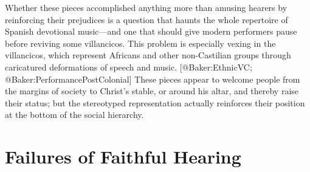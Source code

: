 Whether these pieces accomplished anything more than amusing hearers by reinforcing their prejudices is a question that haunts the whole repertoire of Spanish devotional music---and one that should give modern performers pause before reviving some villancicos.
\Autocite[7]{Cashner:WLSCM32}
This problem is especially vexing in the  villancicos, which represent Africans and other non-Castilian groups through caricatured deformations of speech and music.
[@Baker:EthnicVC; @Baker:PerformancePostColonial]
These pieces appear to welcome people from the margins of society to Christ's stable, or around his altar, and thereby raise their status; but the stereotyped representation actually reinforces their position at the bottom of the social hierarchy.

\section{Failures of Faithful Hearing}

